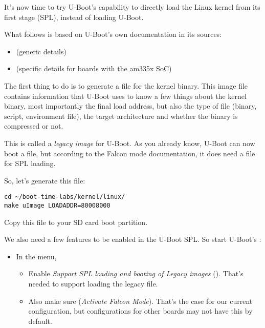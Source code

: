 It's now time to try U-Boot's capability to directly load the
Linux kernel from its first stage (SPL), instead of loading U-Boot.

What follows is based on U-Boot's own documentation in its sources:
\begin{itemize}
\item {} (generic details)
\item {} (specific details for boards with
      the am335x SoC)
\end{itemize}

The first thing to do is to generate a  file for the kernel
binary. This image file contains information that U-Boot uses to know a
few things about the kernel binary, most importantly the final load
address, but also the type of file (binary, script, environment file),
the target architecture and whether the binary is compressed or not.

This is called a {\em legacy image} for U-Boot. As you already know,
U-Boot can now boot a  file, but according to the Falcon
mode documentation, it does need a  file for SPL loading.

So, let's generate this file:
\begin{verbatim}
cd ~/boot-time-labs/kernel/linux/
make uImage LOADADDR=80008000
\end{verbatim}

Copy this  file to your SD card boot partition.

We also need a few features to be enabled in the U-Boot SPL. So start
U-Boot's :
\begin{itemize}
\item In the  menu,
      \begin{itemize}
      \item Enable {\em Support SPL loading and booting of Legacy images}
	    ().
            That's needed to support loading the legacy  file.
      \item Also make sure 
            ({\em Activate Falcon Mode}).
            That's the case for our current configuration, but configurations
            for other boards may not have this by default.
      \end{itemize}
\end{itemize}

